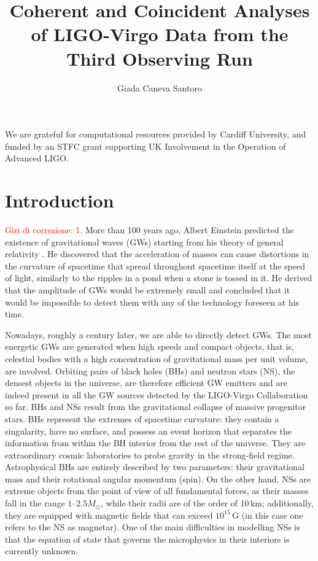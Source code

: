 \documentclass[binding=0.6cm, LaM]{sapthesis}
\title{Coherent and Coincident Analyses of LIGO-Virgo Data from the Third Observing Run}
\author{Giada Caneva Santoro}
\newcommand{\fpg}[1]{\textcolor{red}{#1} }
\begin{document}
\frontmatter
\maketitle
\dedication{Se non tengo presente l’universo, perdo il senso delle proporzioni. \\ Italo Calvino.}


\tableofcontents

\begin{acknowledgments}
We are grateful for computational resources provided by Cardiff University, and funded by an STFC grant supporting UK Involvement in the Operation of Advanced LIGO.
\end{acknowledgments}

\mainmatter 

\chapter*{Introduction}
\label{sec:intro}
%
\fpg{Giri di correzione: 1.}%
	More than 100 years ago, Albert Einstein predicted the existence of gravitational waves (GWs) starting from his theory of general relativity \cite{1,2}.
	He discovered that the acceleration of masses
	can cause distortions in the curvature of spacetime that 
        spread throughout spacetime itself at the speed of light, similarly to the ripples in a pond when a stone is tossed in it.
	He derived that the amplitude of GWs would be extremely small and concluded that it would be impossible to detect them with any of the technology foreseen at his time.

	Nowadays, roughly a century later, we are able to directly detect GWs.  
	The most energetic GWs are generated when high speeds and compact objects, that is, 	
	celestial bodies with a high concentration of gravitational mass per unit volume, are involved.
	Orbiting pairs of black holes (BHs) and neutron stars (NS), the densest objects in the universe,
	are therefore efficient GW emitters and are indeed present in all the GW sources detected by the LIGO-Virgo Collaboration so far.
        BHs and NSs result from the gravitational collapse of massive progenitor stars.
        BHs represent the extremes of spacetime curvature:
        they contain a singularity, have no surface, and possess an event horizon that separates the information
        from within the BH interior from the rest of the universe.
        They are extraordinary cosmic laboratories to probe gravity in the strong-field regime.
        Astrophysical BHs are entirely described by two parameters: their gravitational mass and their rotational angular momentum (spin).
        On the other hand, NSs are extreme objects from the point of view of all fundamental forces, 
	as their masses fall in the range $1$--$2.5M_\odot$, while their radii are of the order of 10\,km; 
	additionally, they are equipped with magnetic fields that can exceed $10^{15}\,$G 
	(in this case one refers to the NS as magnetar). 
	One of the main difficulties in modelling NSs is that the equation of state that governs the microphysics in their interiors is currently unknown.
\end{document}
